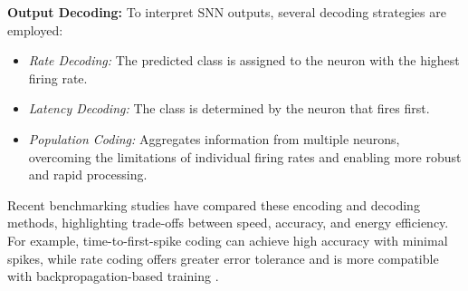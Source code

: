\textbf{Output Decoding:}  
To interpret SNN outputs, several decoding strategies are employed:
\begin{itemize}
    \item \textit{Rate Decoding:} The predicted class is assigned to the neuron with the highest firing rate.
    \item \textit{Latency Decoding:} The class is determined by the neuron that fires first.
    \item \textit{Population Coding:} Aggregates information from multiple neurons, overcoming the limitations of individual firing rates and enabling more robust and rapid processing.
\end{itemize}

Recent benchmarking studies have compared these encoding and decoding methods, highlighting trade-offs between speed, accuracy, and energy efficiency. For example, time-to-first-spike coding can achieve high accuracy with minimal spikes, while rate coding offers greater error tolerance and is more compatible with backpropagation-based training \cite{Zhou2024, Gu2024}.

